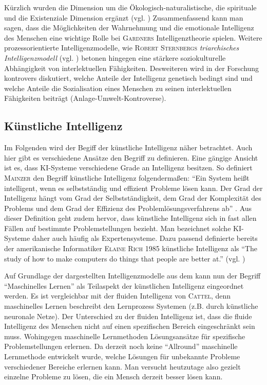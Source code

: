 \documentclass[a4paper, 11pt]{scrartcl}
\begin{document}
Kürzlich wurden die Dimension um die Ökologisch-naturalistische, die spirituale und die Existenziale Dimension ergänzt
(vgl. \cite{Gardner1993})
Zusammenfassend kann man sagen, dass die Möglichkeiten der Wahrnehmung und die emotionale Intelligenz des Menschen eine wichtige Rolle bei \textsc{Gardners} Intelligenztheorie spielen. Weitere prozessorientierte Intelligenzmodelle, wie \textsc{Robert Sternbergs} \textit{triarchisches Intelligenzmodell} (vgl. \cite{Stern1984}) betonen hingegen eine stärkere soziokulturelle Abhängigkeit von interlektuellen Fähigkeiten. Desweiteren wird in der Forschung kontrovers diskutiert, welche Anteile der Intelligenz genetisch bedingt sind und welche Anteile die Sozialisation eines Menschen zu seinen interlektuellen Fähigkeiten beiträgt (Anlage-Umwelt-Kontroverse).

\subsection{Künstliche Intelligenz}
Im Folgenden wird der Begiff der künstliche Intelligenz näher betrachtet. Auch hier gibt es verschiedene Ansätze den Begriff zu definieren. Eine gängige Ansicht ist es, dass KI-Systeme verschiedene Grade an Intelligenz besitzen. So definiert \textsc{Mainzer} den Begriff künstliche Intelligenz folgendermaßen: ``Ein System heißt intelligent, wenn es selbstständig und effizient Probleme lösen kann. Der Grad der Intelligenz hängt vom Grad der Selbstständigkeit, dem Grad der Komplexität des Problems und dem Grad der Effizienz des Problemlösungsverfahrens ab'' \cite{Mainzer2003}. Aus dieser Definition geht zudem hervor, dass künstliche Intelligenz sich in fast allen Fällen auf bestimmte Problemstellungen bezieht. Man bezeichnet solche KI-Systeme daher auch häufig als Expertensysteme. Dazu passend definierte bereits der amerikanische Informatiker \textsc{Elaine Rich} 1985 künstliche Intelligenz als ``The study of how to make computers do things that people are better at.'' (vgl. \cite{Rich1985})

Auf Grundlage der dargestellten Intelligenzmodelle aus dem kann nun der Begriff ``Maschinelles Lernen'' als Teilaspekt der künstlichen Intelligenz eingeordnet werden. Es ist vergleichbar mit der fluiden Intelligenz von \textsc{Cattel}, denn maschinelles Lernen beschreibt den Lernprozess Systemen (z.B. durch künstliche neuronale Netze). Der Unterschied zu der fluiden Intelligenz ist, dass die fluide Intelligenz des Menschen nicht auf einen spezifischen Bereich eingeschränkt sein muss. Wohingegen maschinelle Lernmethoden Lösungsansätze für spezifische Problemstellungen erlernen. Da derzeit noch keine ``Allround'' maschinelle Lernmethode entwickelt wurde, welche Lösungen für unbekannte Probleme verschiedener Bereiche erlernen kann. Man versucht heutzutage also gezielt einzelne Probleme zu lösen, die ein Mensch derzeit besser lösen kann.
\end{document}
